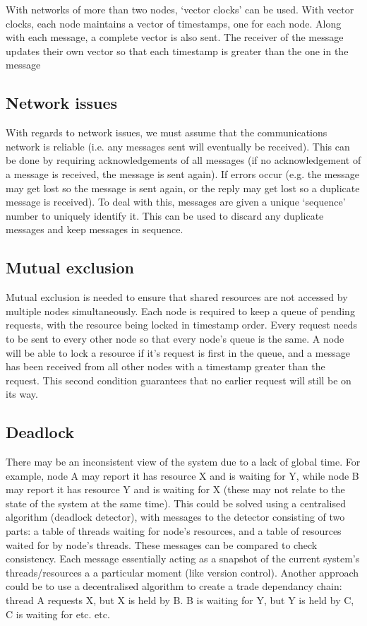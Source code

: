 \documentclass[a4paper,oneside]{report}
\begin{document}
   	With networks of more than two nodes, `vector clocks' can be used. With vector clocks, each node maintains a vector of timestamps, one for each node. Along with each message, a complete vector is also sent. The receiver of the message updates their own vector so that each timestamp is greater than the one in the message
      	
    	\subsection{Network issues}
    	With regards to network issues, we must assume that the communications network is reliable (i.e. any messages sent will eventually be received). This can be done by requiring acknowledgements of all messages (if no acknowledgement of a message is received, the message is sent again). If errors occur (e.g. the message may get lost so the message is sent again, or the reply may get lost so a duplicate message is received). To deal with this, messages are given a unique `sequence' number to uniquely identify it. This can be used to discard any duplicate messages and keep messages in sequence.
    	
    	\subsection{Mutual exclusion}
    	Mutual exclusion is needed to ensure that shared resources are not accessed by multiple nodes simultaneously. Each node is required to keep a queue of pending requests, with the resource being locked in timestamp order. Every request needs to be sent to every other node so that every node’s queue is the same. A node will be able to lock a resource if it's request is first in the queue, and a message has been received from all other nodes with a timestamp greater than the request. This second condition guarantees that no earlier request will still be on its way.
    	
    	\subsection{Deadlock}
    	There may be an inconsistent view of the system due to a lack of global time. For example, node A may report it has resource X and is waiting for Y, while node B may report it has resource Y and is waiting for X (these may not relate to the state of the system at the same time). This could be solved using a centralised algorithm (deadlock detector), with messages to the detector consisting of two parts: a table of threads waiting for node’s resources, and a table of resources waited for by node’s threads. These messages can be compared to check consistency. Each message essentially acting as a snapshot of the current system's threads/resources a a particular moment (like version control). Another approach could be to use a decentralised algorithm to create a trade dependancy chain: thread A requests X, but X is held by B. B is waiting for Y, but Y is held by C, C is waiting for etc. etc. 
    	
\end{document}
